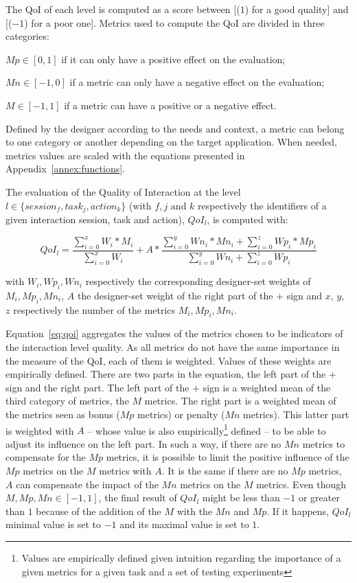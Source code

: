 \documentclass[a4paper,11pt,twoside]{StyleThese}
\begin{document}
The QoI of each level is computed as a score between [($1$) for a good quality] and [($-1$) for a poor one]. Metrics used to compute the QoI are divided in three categories: 
\begin{bulletList}
	\item $Mp \in [0,1]$ if it can only have a positive effect on the evaluation;
	\item $Mn \in [-1,0]$ if a metric can only have a negative effect on the evaluation;
	\item $M \in [-1,1]$ if a metric can have a positive or a negative effect.
\end{bulletList}

Defined by the designer according to the needs and context, a metric can belong to one category or another depending on the target application. When needed, metrics values are scaled with the equations presented in Appendix~\ref{annex:functions}.

The evaluation of the Quality of Interaction at the level $l \in \{session_f,task_j,action_k\}$ (with $f,j \text{ and }k$ respectively the identifiers of a given interaction session, task and action),  $QoI_l$, is computed with:

\begin{equation}\label{eq:qoi}
QoI_{l}= \frac{ \sum\limits_{i=0}^x W_i * M_i}{\sum\limits_{i=0}^x W_i} + A * \frac{ \sum\limits_{i=0}^y Wn_i * Mn_i  + \sum\limits_{i=0}^z Wp_i * Mp_i}{\sum\limits_{i=0}^y Wn_i+\sum\limits_{i=0}^z Wp_i} 
\end{equation}


with $W_i, Wp_i,Wn_i$ respectively the corresponding designer-set weights of $M_i, Mp_i, Mn_i$, $A$ the designer-set weight of the right part of the $+$ sign and $x$, $y$, $z$ respectively the number of the metrics $M_i, Mp_i, Mn_i$.

Equation~\ref{eq:qoi} aggregates the values of the metrics chosen to be indicators of the interaction level quality. As all metrics do not have the same importance in the measure of the QoI, each of them is weighted. Values of these weights are empirically defined. There are two parts in the equation, the left part of the $+$ sign and the right part. The left part of the $+$ sign is a weighted mean of the third category of metrics, the $M$ metrics. The right part is a weighted mean of the metrics seen as bonus (\ie $Mp$ metrics) or penalty (\ie $Mn$ metrics). This latter part is weighted with $A$ -- whose value is also empirically\footnote{Values are empirically defined given intuition regarding the importance of a given metrics for a given task and a set of testing experiments} defined -- to be able to adjust its influence on the left part. In such a way, if there are no $Mn$ metrics to compensate for the $Mp$ metrics, it is possible to limit the positive influence of the $Mp$ metrics on the $M$ metrics with $A$. It is the same if there are no $Mp$ metrics, $A$ can compensate the impact of the $Mn$ metrics on the $M$ metrics. Even though $M, Mp, Mn \in [-1,1]$, the final result of $QoI_l$ might be less than $-1$ or greater than $1$ because of the addition of the $M$ with the $Mn$ and $Mp$. If it happens, $QoI_l$ minimal value is set to $-1$ and its maximal value is set to $1$.
\end{document}
